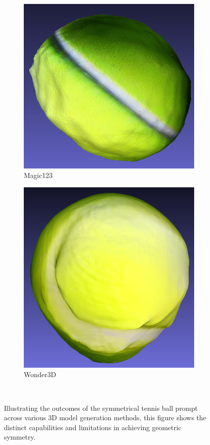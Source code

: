 \begin{figure}[ht]
    \begin{subfigure}[b]{0.22\textwidth}
        \centering
        \includegraphics[width=\textwidth]{figures/technical/magic123_ball_result.png}
        \caption{Magic123}
    \end{subfigure}
    \begin{subfigure}[b]{0.2\textwidth}
        \centering
        \includegraphics[width=\textwidth]{figures/technical/wonder3d_ball_result.png}
        \caption{Wonder3D}
    \end{subfigure}
    \caption{Illustrating the outcomes of the symmetrical tennis ball prompt across various 3D model generation methods, this figure shows the distinct capabilities and limitations in achieving geometric symmetry.}~\label{fig:Ball}
\end{figure}




